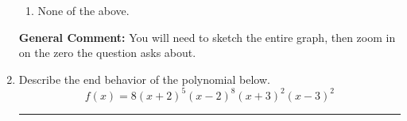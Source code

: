 \documentclass{extbook}[14pt]
\newcommand{\litem}[1]{\item #1

\rule{\textwidth}{0.4pt}}
\begin{document}
\begin{enumerate}
{\begin{enumerate}[label=\Alph*.]
\item None of the above.\end{enumerate}
\textbf{General Comment:} You will need to sketch the entire graph, then zoom in on the zero the question asks about.
}
\litem{
Describe the end behavior of the polynomial below.
\[ f(x) = 8(x + 2)^{5}(x - 2)^{8}(x + 3)^{2}(x - 3)^{2} \]

}
\end{enumerate}
\end{document}
